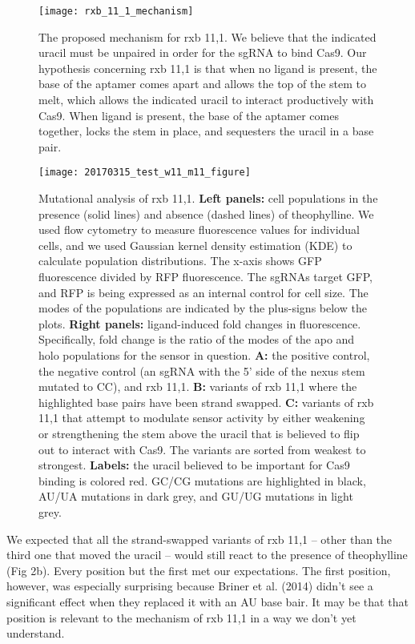 \documentclass{article}
\newcommand{\subcap}[1]{\textbf{#1:}}
\newcommand{\rxb}[1]{rxb 11,1}
\begin{document}
\begin{figure}
 \centering
 \texttt{[image: rxb\_11\_1\_mechanism]}
 \caption{The proposed mechanism for \rxb{}.  We believe that the indicated 
 uracil must be unpaired in order for the sgRNA to bind Cas9.  Our hypothesis 
 concerning \rxb{} is that when no ligand is present, the base of the aptamer 
 comes apart and allows the top of the stem to melt, which allows the indicated 
 uracil to interact productively with Cas9.  When ligand is present, the base 
 of the aptamer comes together, locks the stem in place, and sequesters the 
 uracil in a base pair.}
\end{figure}

\begin{figure}
 \centering
 \texttt{[image: 20170315\_test\_w11\_m11\_figure]}
 \caption{Mutational analysis of \rxb{}. \subcap{Left panels} cell populations 
 in the presence (solid lines) and absence (dashed lines) of theophylline.  We 
 used flow cytometry to measure fluorescence values for individual cells, and 
 we used Gaussian kernel density estimation (KDE) to calculate population 
 distributions.  The x-axis shows GFP fluorescence divided by RFP fluorescence.  
 The sgRNAs target GFP, and RFP is being expressed as an internal control for 
 cell size.  The modes of the populations are indicated by the plus-signs below 
 the plots.  \subcap{Right panels} ligand-induced fold changes in fluorescence.  
 Specifically, fold change is the ratio of the modes of the apo and holo 
 populations for the sensor in question.  \subcap{A} the positive control, the 
 negative control (an sgRNA with the 5' side of the nexus stem mutated to CC), 
 and \rxb{}.  \subcap{B} variants of \rxb{} where the highlighted base pairs 
 have been strand swapped.  \subcap{C} variants of \rxb{} that attempt to 
 modulate sensor activity by either weakening or strengthening the stem above 
 the uracil that is believed to flip out to interact with Cas9.  The variants 
 are sorted from weakest to strongest.  \subcap{Labels} the uracil believed to 
 be important for Cas9 binding is colored red.  GC/CG mutations are highlighted 
 in black, AU/UA mutations in dark grey, and GU/UG mutations in light grey.}
\end{figure}

We expected that all the strand-swapped variants of \rxb{} -- other than the 
third one that moved the uracil -- would still react to the presence of 
theophylline (Fig 2b).  Every position but the first met our expectations.  The 
first position, however, was especially surprising because Briner et al.  
(2014) didn't see a significant effect when they replaced it with an AU base 
bair.  It may be that that position is relevant to the mechanism of \rxb{} in 
a way we don't yet understand.
\end{document}
